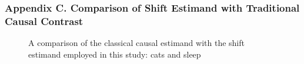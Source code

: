 \documentclass[
  singlecolumn,
  9pt]{article}
\begin{document}
\begin{table}

\caption{\label{tbl-table\_social\_vars\_dogs}Social well-being
variables measured at baseline}


\end{table}%

\subsubsection{Appendix C. Comparison of Shift Estimand with Traditional
Causal
Contrast}\label{appendix-c.-comparison-of-shift-estimand-with-traditional-causal-contrast}

\begin{figure}


\caption{\label{fig-comparative-graph-cats}A comparison of the classical
causal estimand with the shift estimand employed in this study: cats and
sleep}

\end{figure}%

\newpage{}
\end{document}
